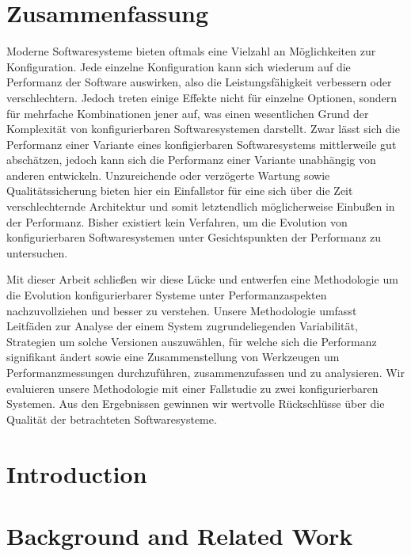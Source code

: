 \documentclass[
	12pt,
	a4paper,
	oneside,
	openright,
	listof=totoc%
]{scrbook}
\begin{document}
\newpage
\chapter*{Zusammenfassung}
Moderne Softwaresysteme bieten oftmals eine Vielzahl an Möglichkeiten zur
Konfiguration. Jede einzelne Konfiguration kann sich wiederum auf die
Performanz der Software auswirken, also die Leistungsfähigkeit verbessern oder
verschlechtern.
Jedoch treten einige Effekte nicht für einzelne Optionen, sondern für mehrfache Kombinationen
jener auf, was einen wesentlichen Grund der Komplexität von konfigurierbaren
Softwaresystemen darstellt. Zwar lässt sich die Performanz einer Variante eines
konfigierbaren Softwaresystems mittlerweile gut abschätzen, jedoch kann sich die Performanz
einer Variante unabhängig von anderen entwickeln. Unzureichende oder verzögerte
Wartung sowie Qualitätssicherung bieten hier ein Einfallstor für eine sich über
die Zeit verschlechternde Architektur und somit letztendlich
möglicherweise Einbußen in der Performanz. Bisher existiert kein Verfahren, um
die Evolution von konfigurierbaren Softwaresystemen unter Gesichtspunkten der Performanz zu
untersuchen.

Mit dieser Arbeit schließen wir diese Lücke und entwerfen eine Methodologie um
die Evolution konfigurierbarer Systeme unter Performanzaspekten
nachzuvollziehen und besser zu verstehen. Unsere Methodologie umfasst Leitfäden
zur Analyse der einem System zugrundeliegenden Variabilität, Strategien um
solche Versionen auszuwählen, für welche sich die Performanz signifikant ändert
sowie eine Zusammenstellung von Werkzeugen um Performanzmessungen durchzuführen,
zusammenzufassen und zu analysieren. 
Wir evaluieren unsere Methodologie mit einer Fallstudie zu zwei konfigurierbaren Systemen. Aus den Ergebnissen
gewinnen wir wertvolle Rückschlüsse über die Qualität der betrachteten
Softwaresysteme.

\tableofcontents
\listoffigures
\listoftables
{}
\chapter{Introduction}\label{chapter:1}
\setcounter{page}{1}


\chapter{Background and Related Work}\label{chapter:2}

\end{document}

